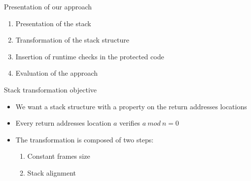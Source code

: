 \documentclass{beamer}
\begin{document}
\begin{frame}[c]{Presentation of our approach}
	\begin{enumerate}\itemsep16pt
		\item Presentation of the stack
		\item Transformation of the stack structure
		\item Insertion of runtime checks in the protected code
		\item Evaluation of the approach
	\end{enumerate}
\end{frame}


\begin{frame}[c]{Stack transformation objective}
	\begin{itemize}\itemsep16pt
		\item We want a stack structure with a property on the return addresses locations
		\item Every return addresses location \underline{$a$} verifies \underline{$a~mod~n=0$}
		\item The transformation is composed of two steps:
			\begin{enumerate}
				\item Constant frames size
				\item Stack alignment
			\end{enumerate}
	\end{itemize}
\end{frame}
\end{document}
